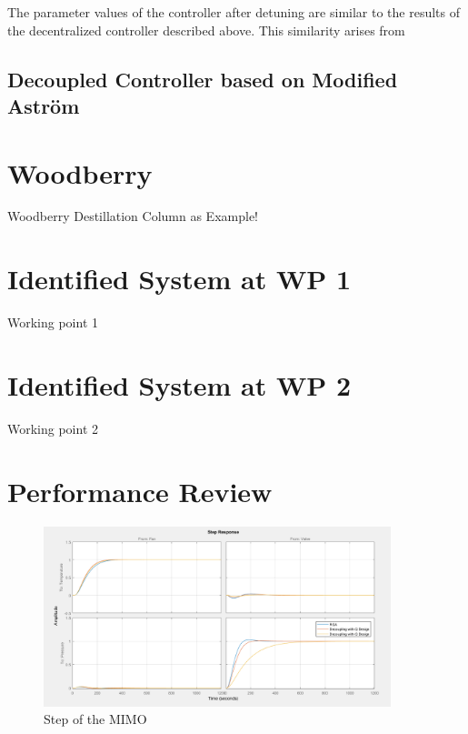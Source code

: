 The parameter values of the controller after detuning are similar to the results of the decentralized controller described above. This similarity arises from  



\subsection{Decoupled Controller based on Modified Astr\"om}
\label{c:fotd:s:rosenbrock:ss:modifiedastr}

\section{Woodberry}%
\label{c:fotd:s:woodberry}

Woodberry Destillation Column as Example!

\section{Identified System at WP 1}%
\label{c:fotd:s:wp1}

Working point 1

\section{Identified System at WP 2}%
\label{c:fotd:s:wp1}

Working point 2

\section{Performance Review} %
\label{c:fotd:s:performance_review}

\begin{figure}[H]
\begin{minipage}[b]{\textwidth}
\centering
\includegraphics[width=0.9\textwidth]{./Graphics/Step_MATLAB.png}
\caption{Step of the MIMO}
\label{c:fotd:f:mimo_step}
\end{minipage}
\end{figure}

